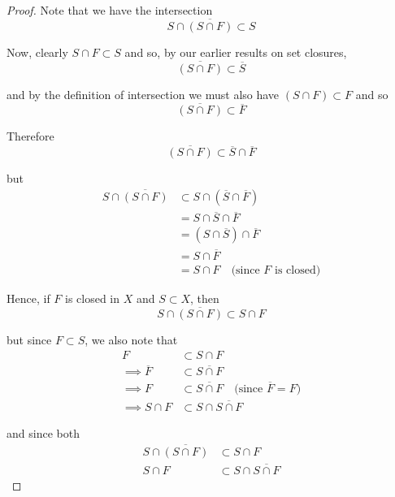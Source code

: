 \documentclass[12pt]{article}
\begin{document}
\begin{proof} Note that we have the intersection 
\begin{equation*}
	S \cap \overline{ \left( S \cap F \right) } \subset S
\end{equation*}

Now, clearly $S \cap F \subset S$ and so, by our earlier results on set closures,
\begin{equation*}
	\overline{ \left( S \cap F \right) } \subset \overline{S}
\end{equation*}

and by the definition of intersection we must also have $\left( S \cap F \right) \subset F$ and so
\begin{equation*}
	\overline{ \left( S \cap F \right) } \subset \overline{F}
\end{equation*}

Therefore
\begin{equation*}
	\overline{ \left( S \cap F \right) } \subset \overline{S} \cap \overline{F}
\end{equation*}

but
\begin{align*}
	S \cap \overline{ \left( S \cap F \right) } &\subset S \cap \left( \overline{S} \cap \overline{F} \right) \\
	&= S \cap \overline{S} \cap \overline{F} \\
	&= \left(S \cap \overline{S}\right) \cap \overline{F} \\
	&= S \cap \overline{F} \\ 
	&= S \cap F \quad \text{(since $F$ is closed)} 
\end{align*}

Hence, if $F$ is closed in $X$ and $S \subset X$, then
\begin{equation*}
	S \cap \overline{ \left( S \cap F \right) } \subset S \cap F
\end{equation*}

but since $F \subset S$, we also note that
\begin{align*}
	F &\subset S \cap F \\
	\implies \overline{F} &\subset \overline{S \cap F} \\
	\implies F &\subset \overline{S \cap F} \quad \text{(since $\overline{F} = F$)} \\
	\implies S \cap F &\subset S \cap \overline{S \cap F} 
\end{align*}

and since both
\begin{align*}
	S \cap \overline{ \left( S \cap F \right) } &\subset S \cap F \\
	S \cap F &\subset S \cap \overline{S \cap F} 
\end{align*}


\end{proof}
\end{document}
